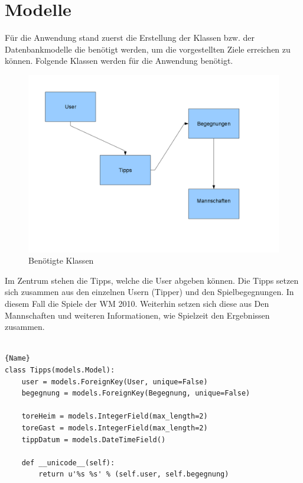 \documentclass[titlepage, 12pt,a4paper]{scrartcl}
\begin{document}
\section{Modelle}
Für die Anwendung stand zuerst die Erstellung der Klassen bzw. der
Datenbankmodelle die benötigt werden, um die vorgestellten Ziele erreichen zu
können. Folgende Klassen werden für die Anwendung benötigt. 

\begin{figure}[ht]
 \begin{center}
  \includegraphics[scale=0.5]{pictures/klassen.png}
 \end{center}
 \caption{Benötigte Klassen}
 \label{klassen}
\end{figure}

Im Zentrum stehen die Tipps, welche die User abgeben können. Die Tipps setzen
sich zusammen aus den einzelnen Usern (Tipper) und den Spielbegegnungen. In
diesem Fall die Spiele der WM 2010. Weiterhin setzen sich diese aus Den
Mannschaften und weiteren Informationen, wie Spielzeit den Ergebnissen zusammen.
\\
\\

\begin{lstlisting}[caption=Modelle in Django]{Name}
class Tipps(models.Model):
    user = models.ForeignKey(User, unique=False)
    begegnung = models.ForeignKey(Begegnung, unique=False)
    
    toreHeim = models.IntegerField(max_length=2)
    toreGast = models.IntegerField(max_length=2)
    tippDatum = models.DateTimeField()
    
    def __unicode__(self):
        return u'%s %s' % (self.user, self.begegnung)
   
\end{lstlisting}
\end{document}
